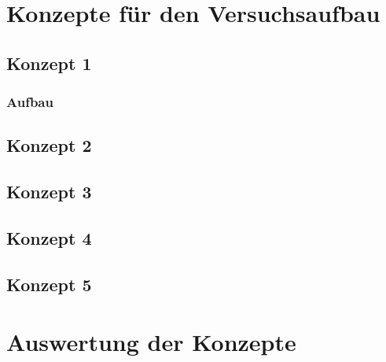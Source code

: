\chapter{Konzepte f\"{u}r den Versuchsaufbau}\label{ch:implementation}
\section{Konzept 1}
\subsection{Aufbau}
\section{Konzept 2}
\section{Konzept 3}
\section{Konzept 4}
\section{Konzept 5}


\chapter{Auswertung der Konzepte}\label{ch:conclusion}


